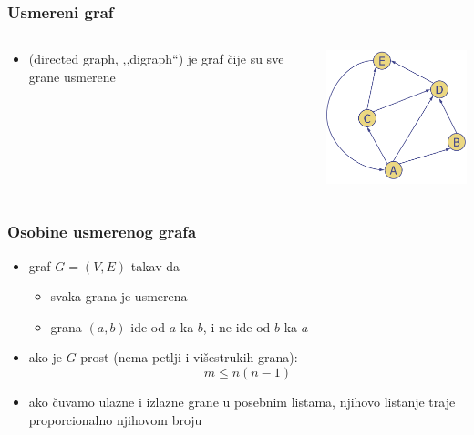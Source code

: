 \documentclass[compress]{beamer}
\begin{document}
\begin{frame}[fragile]
  \frametitle{Usmereni graf}
  \begin{columns}
    \begin{column}[t]{6cm}
      \begin{itemize}
        \item {} (directed graph, ,,digraph``) je 
          graf čije su sve grane usmerene
      \end{itemize}
    \end{column}
    \begin{column}[t]{6cm}
      \begin{center}
        \includegraphics[width=5cm]{asp-14-pic28.png}
      \end{center}
    \end{column}
  \end{columns}
\end{frame}

\begin{frame}[fragile]
  \frametitle{Osobine usmerenog grafa}
  \begin{itemize}
    \item graf $G=(V,E)$ takav da
    \begin{itemize}
      \item svaka grana je usmerena
      \item grana $(a,b)$ ide od $a$ ka $b$, i ne ide od $b$ ka $a$
    \end{itemize}
    \item ako je $G$ prost (nema petlji i višestrukih grana): $$m\leq n(n-1)$$
    \item ako čuvamo ulazne i izlazne grane u posebnim listama, njihovo
      listanje traje proporcionalno njihovom broju
  \end{itemize}
\end{frame}
\end{document}
